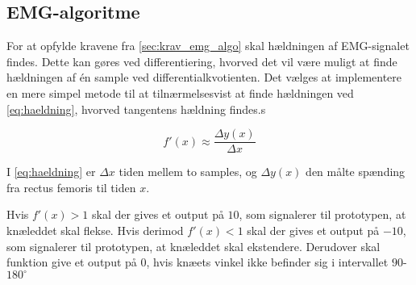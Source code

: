 \subsection{EMG-algoritme} \label{sec:EMG_algo_imp}
For at opfylde kravene fra \autoref{sec:krav_emg_algo} skal hældningen af EMG-signalet findes. Dette kan gøres ved differentiering, hvorved det vil være muligt at finde hældningen af én sample ved differentialkvotienten. Det vælges at implementere en mere simpel metode til at tilnærmelsesvist at finde hældningen ved \autoref{eq:haeldning}, hvorved tangentens hældning findes.s

\begin{equation}
f'(x)\approx\dfrac{\Delta y(x)}{\Delta x}
\label{eq:haeldning}
\end{equation}

\noindent
I \autoref{eq:haeldning} er $\Delta x$ tiden mellem to samples, og $\Delta y(x)$ den målte spænding fra rectus femoris til tiden $x$. 

Hvis $f'(x)>1$ skal der gives et output på $10$, som signalerer til prototypen, at knæleddet skal flekse. Hvis derimod $f'(x)<1$ skal der gives et output på $-10$, som signalerer til prototypen, at knæleddet skal ekstendere. Derudover skal funktion give et output på $0$, hvis knæets vinkel ikke befinder sig i intervallet $90$-$180^{\circ}$